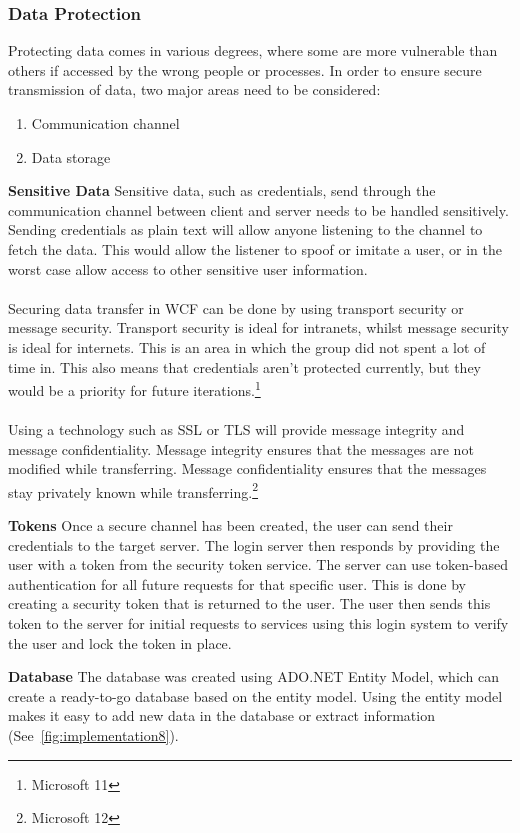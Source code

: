 \subsubsection {Data Protection}
Protecting data comes in various degrees, where some are more
vulnerable than others if accessed by the wrong people or processes.
 In order to ensure secure transmission of data, two major areas
  need to be considered:
\begin{enumerate}
	\item Communication channel
	\item Data storage
\end{enumerate}
\textbf {Sensitive Data}
Sensitive data, such as credentials, send through the communication
 channel between client and server needs to be handled sensitively.
  Sending credentials as plain text will allow anyone listening to
  the channel to fetch the data. This would allow the listener to
  spoof or imitate a user, or in the worst case allow access to
   other sensitive user information.
\\\\
Securing data transfer in WCF can be done by using transport
security or message security. Transport security is ideal for
 intranets, whilst message security is ideal for internets.
  This is an area in which the group did not spent a lot of time in.
   This also means that credentials aren’t protected currently,
    but they would be a priority for future iterations.\footnote{Microsoft 11}
\\\\
Using a technology such as SSL or TLS will provide message integrity
 and message confidentiality. Message integrity ensures that the messages
 are not modified while transferring. Message confidentiality ensures
  that the messages stay privately known while
  transferring.\footnote{Microsoft 12}

\textbf {Tokens}
Once a secure channel has been created, the user can send their
credentials to the target server. The login server then responds
 by providing the user with a token from the security token service.
 The server can use token-based authentication for all future requests
 for that specific user. This is done by creating a security token that
 is returned to the user. The user then sends this token to the server for
  initial requests to services using this login system to verify the user
   and lock the token in place.

\textbf {Database}
The database was created using ADO.NET Entity Model, which can create a
ready-to-go database based on the entity model. Using the entity model
 makes it easy to add new data in the database or extract
  information (See~\ref{fig:implementation8}).

